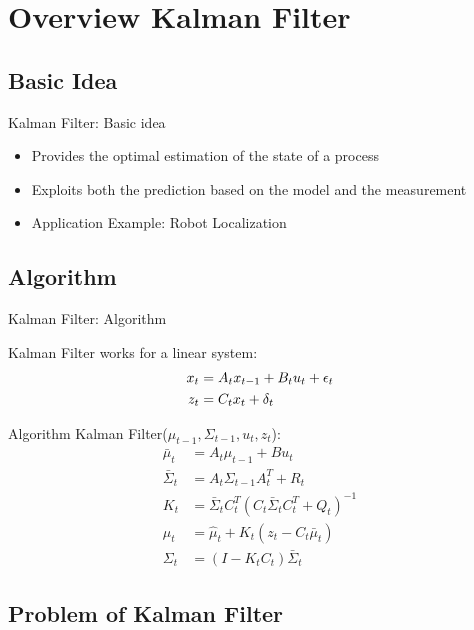 \section{Overview Kalman Filter} 
\subsection{Basic Idea}
\begin{frame}{Kalman Filter: Basic idea}
\begin{itemize}
    \item Provides the optimal estimation of the state of a process
    \item Exploits both the prediction based on the model and the measurement
    \item Application Example: Robot Localization
\end{itemize}
\end{frame}

\subsection{Algorithm}

\begin{frame}{Kalman Filter: Algorithm}  %

Kalman Filter works for a linear system:
\begin{align*}
x_{t} &= A_tx_{t-1} + B_tu_{t} + \epsilon_{t}\notag\\
z_{t} &= C_tx_{t} + \delta_{t}
\end{align*}   

\pause

\begin{block}{Algorithm Kalman Filter($\mu_{t-1}, \Sigma_{t-1}, u_t, z_t$):}
\begin{align*}
\bar \mu_{t} &= A_t\mu_{t-1} + Bu_{t}\\
\bar \Sigma_{t} &= A_t\Sigma_{t-1}A_t^T + R_t\\
K_t &= \bar \Sigma_{t}C_t^T(C_t\bar \Sigma_t C_t^T+Q_t)^{-1}\\
\mu_{t} &= \hat \mu_{t} + K_t(z_t-C_t\bar\mu_t)\\
\Sigma_{t} &= (I-K_tC_t)\bar\Sigma_t
\end{align*}   
\end{block}
\end{frame}

\subsection{Problem of Kalman Filter}

